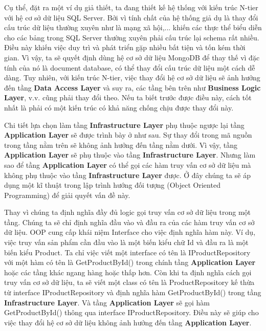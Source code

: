 \documentclass[../DoAn.tex]{subfiles}
\begin{document}
Cụ thể, đặt ra một ví dụ giả thiết, ta đang thiết kế hệ thống với kiến trúc N-tier với hệ cơ sở dữ liệu SQL Server. Bởi vì tính chất của hệ thống giả dụ là thay đổi cấu trúc dữ liệu thường xuyên như là mạng xã hội,... khiến các thực thể biểu diễn cho các bảng trong SQL Server thường xuyên phải cấu trúc lại schema rất nhiều. Điều này khiến việc duy trì và phát triển gặp nhiều bất tiện và tốn kém thời gian. Vì vậy, ta sẽ quyết định dùng hệ cơ sở dữ liệu MongoDB để thay thế vì đặc tính của nó là document database, có thể thay đổi cấu trúc dữ liệu một cách dễ dàng. Tuy nhiên, với kiến trúc N-tier, việc thay đổi hệ cơ sở dữ liệu sẽ ảnh hưởng đến tầng \textbf{Data Access Layer} và suy ra, các tầng bên trên như \textbf{Business Logic Layer}, v.v. cũng phải thay đổi theo. Nếu ta biết trước được điều này, cách tốt nhất là phải có một kiến trúc có khả năng chống chịu được thay đổi này.

Chi tiết lựa chọn làm tầng \textbf{Infrastructure Layer} phụ thuộc ngược lại tầng \textbf{Application Layer} sẽ được trình bày ở như sau. Sự thay đổi trong mã nguồn trong tầng nằm trên sẽ không ảnh hưởng đến tầng nằm dưới. Vì vậy, tầng \textbf{Application Layer} sẽ phụ thuộc vào tầng \textbf{Infrastructure Layer}. Nhưng làm sao để tầng \textbf{Application Layer} có thể gọi các hàm truy vấn cơ sở dữ liệu mà không phụ thuộc vào tầng \textbf{Infrastructure Layer} được. Ở đây chúng ta sẽ áp dụng một kĩ thuật trong lập trình hướng đối tượng (Object Oriented Programming) để giải quyết vấn đề này.

Thay vì chúng ta định nghĩa đầy đủ logic gọi truy vấn cơ sở dữ liệu trong một tầng. Chúng ta sẽ chỉ định nghĩa đầu vào và đầu ra của các hàm truy vấn cơ sở dữ liệu. OOP cung cấp khái niệm Interface cho việc định nghĩa hàm này. Ví dụ, việc truy vấn sản phẩm cần đầu vào là một biến kiểu chữ Id và đầu ra là một biến kiểu Product. Ta chỉ việc viết một interface có tên là IProductRepository với một hàm có tên là GetProductById() trong chính tầng \textbf{Application Layer} hoặc các tầng khác ngang hàng hoặc thấp hơn. Còn khi ta định nghĩa cách gọi truy vấn cơ sở dữ liệu, ta sẽ viết một class có tên là ProductRepository kế thừa từ interface IProductRepository và định nghĩa hàm GetProductById() trong tầng \textbf{Infrastructure Layer}. Và tầng \textbf{Application Layer} sẽ gọi hàm GetProductById() thông qua interface IProductRepository. Điều này sẽ giúp cho việc thay đổi hệ cơ sở dữ liệu không ảnh hưởng đến tầng \textbf{Application Layer}.
\end{document}
